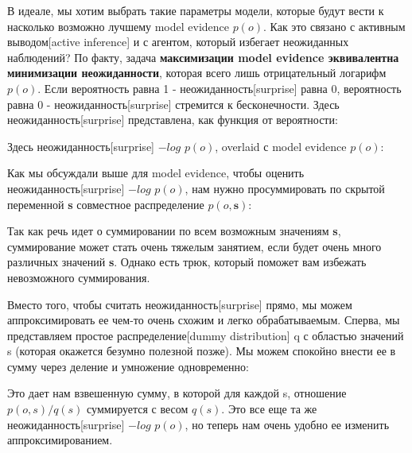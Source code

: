 \documentclass[twoside,leqno, 11pt]{article}
\begin{document}
	В идеале, мы хотим выбрать такие параметры модели, которые будут вести к насколько возможно лучшему model evidence $p(o)$. Как это связано с активным выводом[active inference] и с агентом, который избегает неожиданных наблюдений? По факту, задача \textbf{максимизации model evidence эквивалентна минимизации неожиданности}, которая всего лишь отрицательный логарифм $p(o)$. Если вероятность равна 1 - неожиданность[surprise] равна 0, вероятность равна 0 - неожиданность[surprise] стремится к бесконечности. Здесь неожиданность[surprise] представлена, как функция от вероятности:
	
	
	Здесь неожиданность[surprise] $-log$ $p(o)$, overlaid с model evidence $p(o)$:
	
	
	Как мы обсуждали выше для model evidence, чтобы оценить неожиданность[surprise] $-log$ $p(o)$, нам  нужно просуммировать по скрытой переменной \textbf{s} совместное распределение $p(o, \textbf{s})$:
	
	
	Так как речь идет о суммировании по всем возможным значениям \textbf{s}, суммирование может стать очень тяжелым занятием, если будет очень много различных значений \textbf{s}. Однако есть трюк, который поможет вам избежать невозможного суммирования.
	
	Вместо того, чтобы считать неожиданность[surprise] прямо, мы можем аппроксимировать ее чем-то очень схожим и легко обрабатываемым. Сперва, мы представляем простое распределение[dummy distribution] q с областью значений s (которая окажется безумно полезной позже). Мы можем спокойно внести ее в сумму через деление и умножение одновременно: 
	
	
	Это дает нам взвешенную сумму, в которой для каждой s, отношение $p(o, s)/q(s)$ суммируется с весом $q(s)$. Это все еще та же неожиданность[surprise] $-log$ $p(o)$, но теперь нам очень удобно ее изменить аппроксимированием.
	
\end{document}
